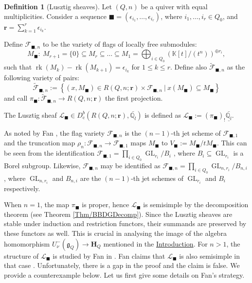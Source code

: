 \documentclass[11pt,english]{article}
\numberwithin{equation}{section}
\numberwithin{figure}{section}
\theoremstyle{definition}
\newtheorem{df}{Definition}[subsection]
\theoremstyle{plain}
\theoremstyle{remark}
\DeclareMathOperator{\GL}{GL}
\DeclareMathOperator{\rk}{rk}
\newcommand\rr{\mathbf{r}}
\newcommand\QQ{\mathbb{Q}}
\newcommand\KK{\mathbb{K}}
\begin{document}
\begin{df}[Lusztig sheaves]

Let $(Q,n)$ be a quiver with equal multiplicities. Consider a sequence
$\blacksquare=(\epsilon_{i_{1}},\ldots,\epsilon_{i_{r}})$, where
$i_{1},\ldots,i_{r}\in Q_{0}$, and $\rr=\sum_{k=1}^{r}\epsilon_{i_{k}}$.

Define $\mathcal{F}_{\blacksquare,n}$ to be the variety of flags
of locally free submodules:\[
M_{\blacksquare}:\ M_{r+1}=\{0\}\subseteq M_r\subseteq\ldots\subseteq M_1=\bigoplus_{i\in Q_0}\left( \KK[t]/(t^n)\right)^{\oplus r_i},
\]such that $\rk(M_{k})-\rk(M_{k+1})=\epsilon_{i_{k}}$ for $1\leq k\leq r$.
Define also $\tilde{\mathcal{F}}_{\blacksquare,n}$ as the following
variety of pairs:\[
\tilde{\mathcal{F}}_{\blacksquare,n}:=
\left\{
(x,M_{\blacksquare})\in R(Q,n;\rr)\times \mathcal{F}_{\blacksquare,n}\ \vert\ x(M_{\blacksquare})\subseteq M_{\blacksquare}
\right\}
\]and call $\pi_{\blacksquare}:\tilde{\mathcal{F}}_{\blacksquare,n}\rightarrow R(Q,n;\rr)$
the first projection.

The Lusztig sheaf $\mathcal{L}_{\blacksquare}\in D_{\mathrm{c}}^{b}(R(Q,n;\rr),\bar{\QQ_{l}})$
is defined as $\mathcal{L}_{\blacksquare}:=(\pi_{\blacksquare})_{!}\underline{\bar{\QQ_{l}}}$.

\end{df}

As noted by Fan \cite[Lem. 1.]{Fan14}, the flag variety $\mathcal{F}_{\blacksquare,n}$
is the $(n-1)$-th jet scheme of $\mathcal{F}_{\blacksquare,1}$ and
the truncation map $\rho_{n}:\mathcal{F}_{\blacksquare,n}\rightarrow\mathcal{F}_{\blacksquare,1}$
maps $M_{\blacksquare}$ to $V_{\blacksquare}:=M_{\blacksquare}/tM_{\blacksquare}$.
This can be seen from the identification $\mathcal{F}_{\blacksquare,1}=\prod_{i\in Q_{0}}\GL_{r_{i}}/B_{i}$
, where $B_{i}\subseteq\GL_{r_{i}}$ is a Borel subgroup. Likewise,
$\mathcal{F}_{\blacksquare,n}$ may be identified as $\mathcal{F}_{\blacksquare,n}=\prod_{i\in Q_{0}}\GL_{n,r_{i}}/B_{n,i}$,
where $\GL_{n,r_{i}}$ and $B_{n,i}$ are the $(n-1)$-th jet schemes
of $\GL_{r_{i}}$ and $B_{i}$ respectively.

When $n=1$, the map $\pi_{\blacksquare}$ is proper, hence $\mathcal{L}_{\blacksquare}$
is semisimple by the decomposition theorem (see Theorem \ref{Thm/BBDGDecomp}).
Since the Lusztig sheaves are stable under induction and restriction
functors, their summands are preserved by these functors as well.
This is crucial in analysing the image of the algebra homomorphism
$U_{\nu}^{-}(\mathfrak{g}_{Q})\rightarrow\mathbf{H}_{Q}$ mentioned
in the \hyperref[Intro]{Introduction}. For $n>1$, the structure
of $\mathcal{L}_{\blacksquare}$ is studied by Fan in \cite{Fan14}.
Fan claims that $\mathcal{L}_{\blacksquare}$ is also semisimple in
that case \cite[Prop. 2.]{Fan14}. Unfortunately, there is a gap in
the proof and the claim is false. We provide a counterexample below.
Let us first give some details on Fan's strategy.
\end{document}

